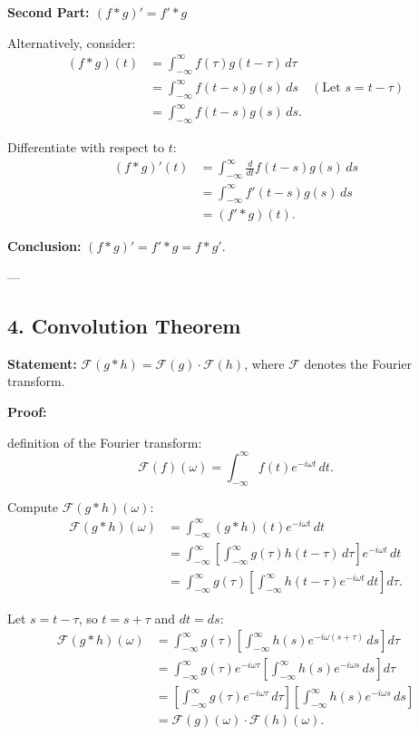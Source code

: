\documentclass[a4paper,12pt]{article}
\begin{document}
\textbf{Second Part: \( (f \ast g)' = f' \ast g \)}

Alternatively, consider:
\[
\begin{aligned}
(f \ast g)(t) &= \int_{-\infty}^{\infty} f(\tau) g(t - \tau) \, d\tau \\
&= \int_{-\infty}^{\infty} f(t - s) g(s) \, ds \quad (\text{Let } s = t - \tau) \\
&= \int_{-\infty}^{\infty} f(t - s) g(s) \, ds.
\end{aligned}
\]

Differentiate with respect to \( t \):
\[
\begin{aligned}
(f \ast g)'(t) &= \int_{-\infty}^{\infty} \frac{d}{dt} f(t - s) g(s) \, ds \\
&= \int_{-\infty}^{\infty} f'(t - s) g(s) \, ds \\
&= (f' \ast g)(t).
\end{aligned}
\]

\textbf{Conclusion:} \( (f \ast g)' = f' \ast g = f \ast g' \).

---

\subsection*{4. Convolution Theorem}
\textbf{Statement:} \( \mathcal{F}(g \ast h) = \mathcal{F}(g) \cdot \mathcal{F}(h) \), where \( \mathcal{F} \) denotes the Fourier transform.

\textbf{Proof:}

definition of the Fourier transform:
\[
\mathcal{F}(f)(\omega) = \int_{-\infty}^{\infty} f(t) e^{-i \omega t} \, dt.
\]

Compute \( \mathcal{F}(g \ast h)(\omega) \):
\[
\begin{aligned}
\mathcal{F}(g \ast h)(\omega) &= \int_{-\infty}^{\infty} (g \ast h)(t) e^{-i \omega t} \, dt \\
&= \int_{-\infty}^{\infty} \left[ \int_{-\infty}^{\infty} g(\tau) h(t - \tau) \, d\tau \right] e^{-i \omega t} \, dt \\
&= \int_{-\infty}^{\infty} g(\tau) \left[ \int_{-\infty}^{\infty} h(t - \tau) e^{-i \omega t} \, dt \right] d\tau.
\end{aligned}
\]

Let \( s = t - \tau \), so \( t = s + \tau \) and \( dt = ds \):
\[
\begin{aligned}
\mathcal{F}(g \ast h)(\omega) &= \int_{-\infty}^{\infty} g(\tau) \left[ \int_{-\infty}^{\infty} h(s) e^{-i \omega (s + \tau)} \, ds \right] d\tau \\
&= \int_{-\infty}^{\infty} g(\tau) e^{-i \omega \tau} \left[ \int_{-\infty}^{\infty} h(s) e^{-i \omega s} \, ds \right] d\tau \\
&= \left[ \int_{-\infty}^{\infty} g(\tau) e^{-i \omega \tau} \, d\tau \right] \left[ \int_{-\infty}^{\infty} h(s) e^{-i \omega s} \, ds \right] \\
&= \mathcal{F}(g)(\omega) \cdot \mathcal{F}(h)(\omega).
\end{aligned}
\]
\end{document}
